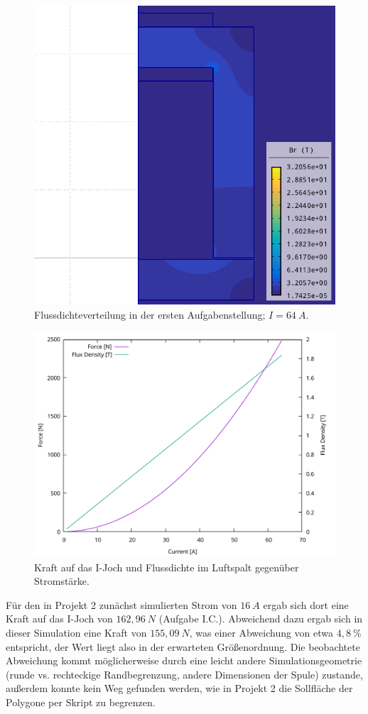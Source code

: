 \documentclass[conference,a4paper,twoside]{IEEEtran}
\begin{document}
\begin{figure}
\centerline{\includegraphics[width=0.7\columnwidth]{../assets/assignment_1_simulation.png}}
\caption{Flussdichteverteilung in der ersten Aufgabenstellung; $I = 64\ A$.}
\label{assignment_1_simulation}
\end{figure}

\begin{figure}
\centerline{\includegraphics[width=\columnwidth]{../assets/assignment_1_plot.pdf}}
\caption{Kraft auf das I-Joch und Flussdichte im Luftspalt gegenüber Stromstärke.}
\label{assignment_1_plot}
\end{figure}

Für den in Projekt 2 zunächst simulierten Strom von $16\ A$ ergab sich dort eine Kraft auf das I-Joch von $162,96\ N$ (Aufgabe I.C.). Abweichend dazu ergab sich in dieser Simulation eine Kraft von $155,09\ N$, was einer Abweichung von etwa $4,8\ \%$ entspricht, der Wert liegt also in der erwarteten Größenordnung. Die beobachtete Abweichung kommt möglicherweise durch eine leicht andere Simulationsgeometrie (runde vs. rechteckige Randbegrenzung, andere Dimensionen der Spule) zustande, außerdem konnte kein Weg gefunden werden, wie in Projekt 2 die Sollfläche der Polygone per Skript zu begrenzen.
\end{document}
